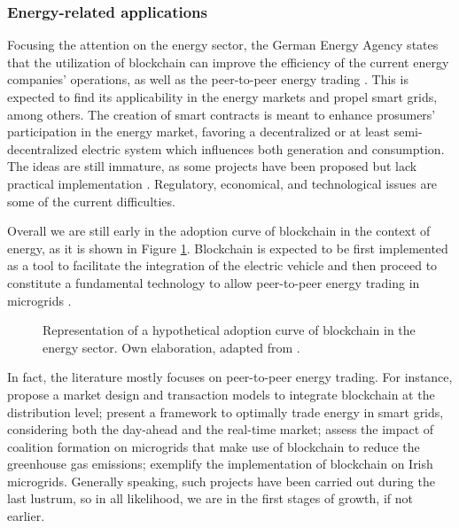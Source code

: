 \subsubsection{Energy-related applications}
Focusing the attention on the energy sector, the German Energy Agency states that the utilization of blockchain can improve the efficiency of the current energy companies' operations, as well as the peer-to-peer energy trading \cite{burger2016blockchain}. This is expected to find its applicability in the energy markets and propel smart grids, among others. The creation of smart contracts is meant to enhance prosumers' participation in the energy market, favoring a decentralized or at least semi-decentralized electric system which influences both generation and consumption. The ideas are still immature, as some projects have been proposed but lack practical implementation \cite{khan2019blockchain, el2020real}. Regulatory, economical, and technological issues are some of the current difficulties.

Overall we are still early in the adoption curve of blockchain in the context of energy, as it is shown in Figure \ref{fig:block3}. Blockchain is expected to be first implemented as a tool to facilitate the integration of the electric vehicle and then proceed to constitute a fundamental technology to allow peer-to-peer energy trading in microgrids \cite{brilliantova2019blockchain,kang2017enabling, khan2019blockchain, pipattanasomporn2018blockchain}. 

\begin{figure}[!htb]\centering
    \caption{Representation of a hypothetical adoption curve of blockchain in the energy sector. Own elaboration, adapted from \cite{faugueras2019state}.}
    \label{fig:block3}
\end{figure}

In fact, the literature mostly focuses on peer-to-peer energy trading. For instance, \cite{vangulick2018blockchain} propose a market design and transaction models to integrate blockchain at the distribution level; \cite{wang2019energy} present a framework to optimally trade energy in smart grids, considering both the day-ahead and the real-time market; \cite{thakur2018peer} assess the impact of coalition formation on microgrids that make use of blockchain to reduce the greenhouse gas emissions; \cite{verma2018enerport} exemplify the implementation of blockchain on Irish microgrids. Generally speaking, such projects have been carried out during the last lustrum, so in all likelihood, we are in the first stages of growth, if not earlier. 

